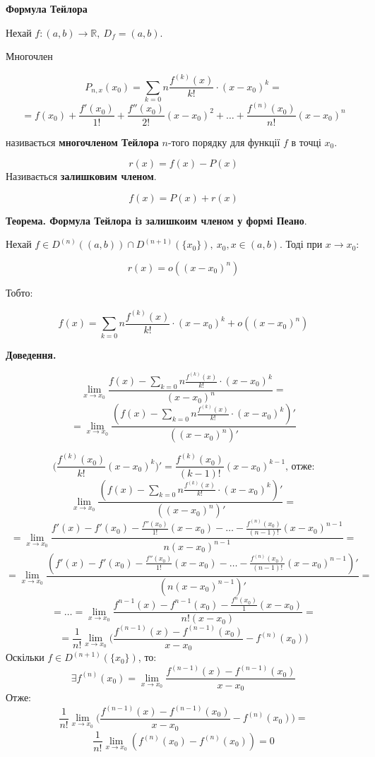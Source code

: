 \documentclass[12pt]{report}
\begin{document}
\begin{center}
\textbf{Формула Тейлора}
\end{center}

Нехай $f : (a,b) \to \mathbb{R},\ D_f = (a,b)$.

Многочлен

$$P_{n,x}(x_0) = \sum_{k = 0}{n}\frac{f^{(k)}(x)}{k!} \cdot (x-x_0)^k = $$
$$= f(x_0) + \frac{f'(x_0)}{1!} + \frac{f''(x_0)}{2!}(x-x_0)^2 + \ldots + \frac{f^{(n)}(x_0)}{n!} (x-x_0)^n$$

називається \textbf{многочленом Тейлора} $n$-того порядку для функції $f$ в точці $x_0$.

$$r(x) = f(x) - P(x)$$
Називається \textbf{залишковим членом}.

$$f(x) = P(x) + r(x)$$

\textbf{Теорема. Формула Тейлора із залишкоим членом у формі Пеано}.

Нехай $f\in D^{(n)}((a,b)) \cap D^{(n+1)}(\{ x_0\}),\ x_0, x \in (a,b)$. Тоді при $x \to x_0$:

$$r(x) = o((x - x_0)^n)$$

Тобто:

$$f(x) = \sum_{k = 0}{n}\frac{f^{(k)}(x)}{k!} \cdot (x-x_0)^k + o((x - x_0)^n)$$

\textbf{Доведення.}

$$\lim_{x\to x_0}\frac{f(x) - \sum_{k = 0}{n}\frac{f^{(k)}(x)}{k!} \cdot (x-x_0)^k}{(x - x_0)^n} = $$
$$ = \lim_{x\to x_0}\frac{(f(x) - \sum_{k = 0}{n}\frac{f^{(k)}(x)}{k!} \cdot (x-x_0)^k)'}{((x - x_0)^n)'} $$

$$\Big(\frac{f^{(k)}(x_0)}{k!} (x - x_0)^k\Big)' = \frac{f^{(k)}(x_0)}{(k-1)!} (x - x_0)^{k-1}\textrm{, отже:}$$
$$\lim_{x\to x_0}\frac{(f(x) - \sum_{k = 0}{n}\frac{f^{(k)}(x)}{k!} \cdot (x-x_0)^k)'}{((x - x_0)^n)'} = $$
$$= \lim_{x \to x_0}\frac{f'(x) - f'(x_0) - \frac{f''(x_0)}{1!}(x - x_0) - \ldots - \frac{f^{(n)}(x_0)}{(n-1)!} (x - x_0)^{n-1}}{n(x - x_0)^{n-1}} = $$
$$= \lim_{x \to x_0}\frac{(f'(x) - f'(x_0) - \frac{f''(x_0)}{1!}(x - x_0) - \ldots - \frac{f^{(n)}(x_0)}{(n-1)!} (x - x_0)^{n-1})'}{(n(x - x_0)^{n-1})'} = $$
$$= \ldots = \lim_{x \to x_0}\frac{f^{n-1}(x) - f^{n-1}(x_0) - \frac{f^{n}(x_0)}{1} (x - x_0)}{n! (x - x_0)} = $$
$$= \frac{1}{n!} \lim_{x\to x_0}\Big( \frac{f^{(n-1)}(x) - f^{(n-1)}(x_0)}{x - x_0} - f^{(n)}(x_0)\Big)$$
Оскільки $f \in D^{(n+1)}(\{ x_0\})$, то:
$$\exists f^{(n)}(x_0) = \lim_{x\to x_0} \frac{f^{(n-1)}(x) - f^{(n-1)}(x_0)}{x - x_0}$$
Отже: 
$$\frac{1}{n!} \lim_{x\to x_0}\Big( \frac{f^{(n-1)}(x) - f^{(n-1)}(x_0)}{x - x_0} - f^{(n)}(x_0)\Big) = $$
$$\frac{1}{n!} \lim_{x \to x_0}(f^{(n)}(x_0) - f^{(n)}(x_0)) = 0$$
\end{document}
